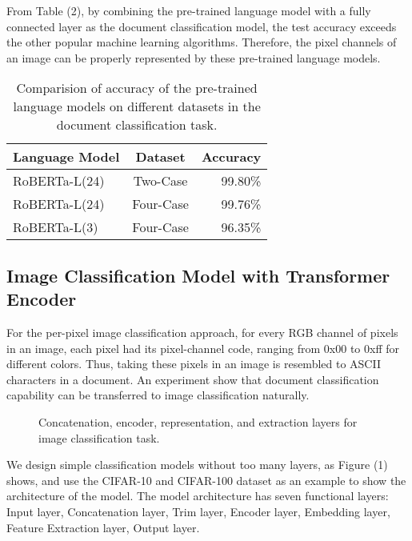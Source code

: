 \documentclass[runningheads]{llncs}
\begin{document}
From Table (2), by combining the pre-trained language model with a fully connected layer as the document classification model,
the test accuracy exceeds the other popular machine learning algorithms.
Therefore, the pixel channels of an image can be properly represented by these pre-trained language models.

\begin{table}
\begin{center}
\begin{tabular}{|l|c|r|}
\hline
Language Model 	& Dataset & Accuracy \\
\hline\hline
RoBERTa-L(24) & Two-Case	&	99.80\% \\
RoBERTa-L(24) & Four-Case	&	99.76\% \\
RoBERTa-L(3)  & Four-Case	&	96.35\% \\
\hline
\end{tabular}
\end{center}
\caption{Comparision of accuracy of the pre-trained language models on different datasets in the document classification task.}
\end{table}


\subsection{Image Classification Model with Transformer Encoder}



\par For the per-pixel image classification approach, for every RGB channel of pixels in an image,
each pixel had its pixel-channel code, ranging from 0x00 to 0xff for different colors.
Thus, taking these pixels in an image is resembled to ASCII characters in a document.
An experiment show that document classification capability can be transferred to image classification naturally.

\begin{figure*}
\begin{center}
\end{center}
   \caption{Concatenation, encoder, representation, and extraction layers for image classification task.}
\label{fig:short}
\end{figure*}

\par We design simple classification models without too many layers, as Figure (1) shows,
and use the CIFAR-10 and CIFAR-100 dataset as an example to show the architecture of the model.
The model architecture has seven functional layers: Input layer,
Concatenation layer,
Trim layer,
Encoder layer,
Embedding layer,
Feature Extraction layer,
Output layer.
\end{document}
